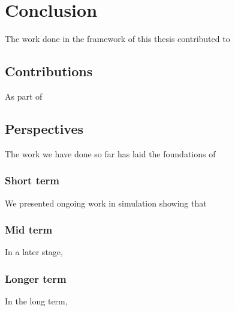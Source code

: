 \chapter{Conclusion}
\label{sec:conclusion}

The work done in the framework of this thesis contributed to

\section{Contributions}

As part of 

\section{Perspectives}

The work we have done so far has laid the foundations of 

\subsection{Short term}

We presented ongoing work in simulation showing that 

\subsection{Mid term}

In a later stage,

\subsection{Longer term}

In the long term, 